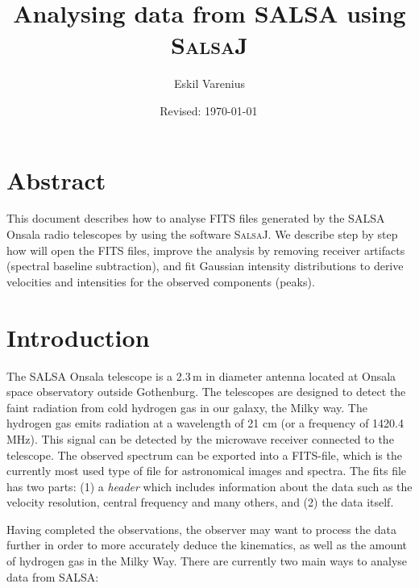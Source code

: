 \documentclass[11pt,a4paper]{article}
\begin{document}
\pagestyle{plain}
\title{\textsf{Analysing data from SALSA using \textsc{SalsaJ}}}
\author{\textsf{Eskil Varenius}}
\yyyymmdddate
\date{\textsf{Revised: \today \, \currenttime}}
 

\maketitle

\section*{Abstract}
This document describes how to analyse FITS files generated by the SALSA Onsala
radio telescopes by using the software \textsc{SalsaJ}.  We describe step by
step how will open the FITS files, improve the analysis by removing receiver
artifacts (spectral baseline subtraction), and fit Gaussian intensity
distributions to derive velocities and intensities for the observed components
(peaks).

\tableofcontents

\section{Introduction}
\label{sec:introduction}

The SALSA Onsala telescope is a 2.3\,m in diameter antenna located at
Onsala space observatory outside Gothenburg. The telescopes are
designed to detect the faint radiation from cold hydrogen gas in our
galaxy, the Milky way. The hydrogen gas emits radiation at a
wavelength of 21 cm (or a frequency of 1420.4 MHz). This signal can be
detected by the microwave receiver connected to the telescope. 
The observed spectrum can be
exported into a FITS-file, which is the currently most used type of
file for astronomical images and spectra. The fits file has two parts:
(1) a \emph{header} which includes information
about the data such as the velocity resolution, central frequency and
many others, and (2) the data itself.

Having completed the observations, the observer may want to process
the data further in order to more accurately deduce the kinematics,
as well as the amount of hydrogen gas in the Milky Way. There
are currently two main ways to analyse data from SALSA:
\end{document}
